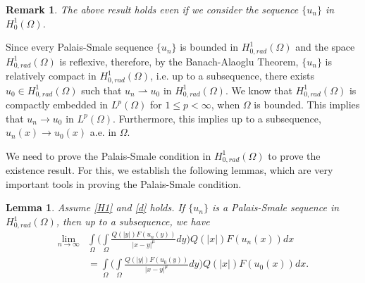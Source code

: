 \documentclass[11pt]{amsart}
\numberwithin{equation}{section}
\newtheorem{lem}[thm]{Lemma}
\newtheorem{rem}{Remark}
\newcommand{\h}{H^1_0(\Omega)}
\newcommand{\hr}{H^1_{0, rad}(\Omega)}
\newcommand{\1}{\frac{1}{2}}
\begin{document}
	\begin{rem}
		\label{rem3} The above result holds even if we consider the sequence $\{u_n\}$ in $\h$.
	\end{rem}
	Since every Palais-Smale sequence $\{u_n\}$ is bounded in $\hr$ and the space $\hr$ is reflexive, therefore, by the Banach-Alaoglu Theorem, $\{u_n\}$ is relatively compact in $\hr$, i.e. up to a subsequence, there exists $u_0 \in \hr$ such that $u_n \rightharpoonup u_0$ in $\hr$. We know that $\hr$ is compactly embedded in $L^p(\Omega)$ for $ 1 \leq p < \infty$, when $\Omega$ is bounded. This implies that $u_n \rightarrow u_0$ in $L^p(\Omega)$. Furthermore, this implies up to a subsequence, $u_n(x) \rightarrow u_0(x)$ a.e. in $\Omega$.
	
	We need to prove the Palais-Smale condition in $\hr$ to prove the existence result. For this, we establish the following lemmas, which are very important tools in proving the Palais-Smale condition.
	\begin{lem} \label{lem3.2}
		Assume \eqref{H1} and \eqref{d} holds. If $\{u_n\}$ is a Palais-Smale sequence in $\hr$, then up to a subsequence, we have
		\begin{align*}
			\lim_{n \rightarrow \infty} &\int\limits_{\Omega} \Bigg( \int\limits_{\Omega} \frac{Q(|y|)F(u_n(y))}{|x-y|^\mu}dy \Bigg) Q(|x|)F(u_n(x))dx\\
			&=
			\int\limits_{\Omega} \Bigg( \int\limits_{\Omega} \frac{Q(|y|)F(u_0(y))}{|x-y|^\mu}dy \Bigg) Q(|x|)F(u_0(x))dx. 
		\end{align*}  
	\end{lem}
\end{document}
